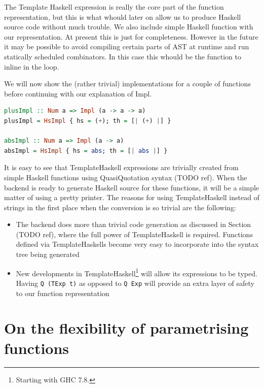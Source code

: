 \documentclass[preamble.tex]{subfiles}
\begin{document}
The Template Haskell expression is really the core part of the function representation, but this is what whould later on allow us to produce Haskell source code without much trouble. We also include simple Haskell function with our representation. At present this is just for completeness. However in the future it may be possible to avoid compiling certain parts of AST at runtime and run statically scheduled combinators. In this case this whould be the function to inline in the loop.

We will now show the (rather trivial) implementations for a couple of functions before continuing with our explanation of Impl.

\begin{lstlisting}[basicstyle={\ttfamily},language=Haskell]
plusImpl :: Num a => Impl (a -> a -> a)
plusImpl = HsImpl { hs = (+); th = [| (+) |] } 

absImpl :: Num a => Impl (a -> a)
absImpl = HsImpl { hs = abs; th = [| abs |] } 
\end{lstlisting}

It is easy to see that TemplateHaskell expressions are trivially created from simple Haskell functions using QuasiQuotation syntax (TODO ref). When the backend is ready to generate Haskell source for these functions, it will be a simple matter of using a pretty printer. The reasons for using TemplateHaskell instead of strings in the first place when the conversion is so trivial are the following:
\begin{itemize}
\item The backend does more than trivial code generation as discussed in Section (TODO ref), where the full power of TemplateHaskell is required. Functions defined via TemplateHaskells become very easy to incorporate into the syntax tree being generated
\item New developments in TemplateHaskell\footnote{Starting with GHC 7.8.} will allow its expressions to be typed. Having \texttt{Q (TExp t)} as opposed to \texttt{Q Exp} will provide an extra layer of safety to our function representation
\end{itemize}


\section{On the flexibility of parametrising functions}
\end{document}

